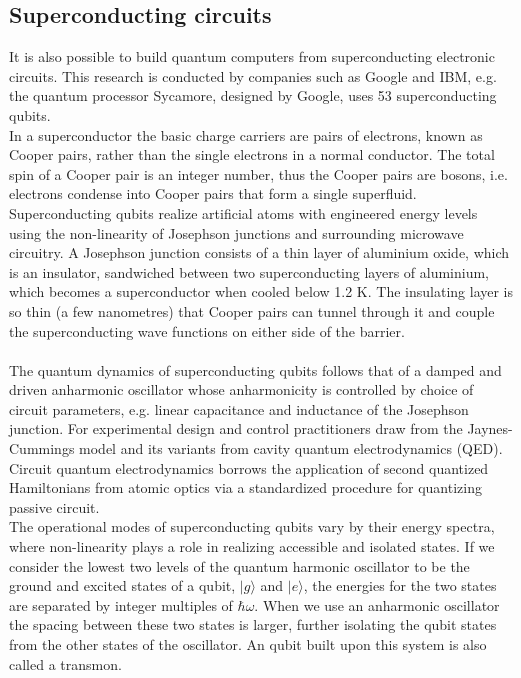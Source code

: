 \subsection{Superconducting circuits}
It is also possible to build quantum computers from superconducting electronic circuits. This research  is conducted by companies such as Google and IBM, e.g. the quantum processor Sycamore, designed by Google, uses 53 superconducting qubits. \\
In a superconductor the basic charge carriers are pairs of electrons, known as Cooper pairs, rather than the single electrons in a normal conductor. The total spin of a Cooper pair is an integer number, thus the Cooper pairs are bosons, i.e. electrons condense into Cooper pairs that form a single superfluid. \\
Superconducting qubits realize artificial atoms with engineered energy levels using the non-linearity of Josephson junctions and surrounding microwave circuitry. A Josephson junction consists of a thin layer of aluminium oxide, which is an insulator, sandwiched between two superconducting layers of aluminium, which becomes a superconductor when cooled below 1.2 K. The insulating layer is so thin (a few nanometres) that Cooper pairs can tunnel through it and couple the superconducting wave functions on either side of the barrier. \\
\\
The quantum dynamics of superconducting qubits follows that of a damped and driven anharmonic oscillator whose anharmonicity is controlled by choice of circuit parameters, e.g. linear capacitance and inductance of the Josephson junction. For experimental design and control practitioners draw from the Jaynes-Cummings model and its variants from cavity quantum electrodynamics (QED). Circuit quantum electrodynamics borrows the application of second quantized Hamiltonians from atomic optics via a standardized procedure for quantizing passive circuit. \\
The operational modes of superconducting qubits vary by their energy spectra, where non-linearity plays a role in realizing accessible and isolated states. If we consider the lowest two levels of the quantum harmonic oscillator to be the ground and excited states of a qubit, $|g\rangle$ and $|e\rangle$, the energies for the two states are separated by integer multiples of $\hbar\omega$. When we use an anharmonic oscillator the spacing between these two states is larger, further isolating the qubit states from the other states of the oscillator. An qubit built upon this system is also called a transmon. \\
